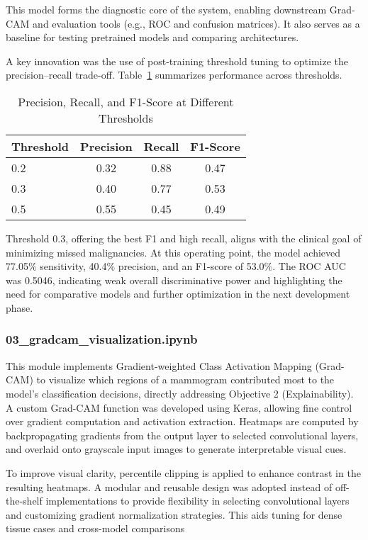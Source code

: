 \documentclass[12pt]{article}
\begin{document}
This model forms the diagnostic core of the system, enabling downstream Grad-CAM and evaluation tools (e.g., ROC and confusion matrices). It also serves as a baseline for testing pretrained models and comparing architectures.

A key innovation was the use of post-training threshold tuning to optimize the precision–recall trade-off. Table~\ref{tab:threshold_metrics} summarizes performance across thresholds.

\begin{table}[H]
\centering
\caption{Precision, Recall, and F1-Score at Different Thresholds}
\label{tab:threshold_metrics}
\begin{tabular}{lccc}
\toprule
Threshold & Precision & Recall & F1-Score \\
\midrule
0.2 & 0.32 & 0.88 & 0.47 \\
0.3 & 0.40 & 0.77 & 0.53 \\
0.5 & 0.55 & 0.45 & 0.49 \\
\bottomrule
\end{tabular}
\end{table}

Threshold 0.3, offering the best F1 and high recall, aligns with the clinical goal of minimizing missed malignancies. At this operating point, the model achieved 77.05\% sensitivity, 40.4\% precision, and an F1-score of 53.0\%. The ROC AUC was 0.5046, indicating weak overall discriminative power and highlighting the need for comparative models and further optimization in the next development phase.

\subsubsection{03\_gradcam\_visualization.ipynb}

This module implements Gradient-weighted Class Activation Mapping (Grad-CAM) to visualize which regions of a mammogram contributed most to the model’s classification decisions, directly addressing Objective 2 (Explainability). A custom Grad-CAM function was developed using Keras, allowing fine control over gradient computation and activation extraction. Heatmaps are computed by backpropagating gradients from the output layer to selected convolutional layers, and overlaid onto grayscale input images to generate interpretable visual cues.

To improve visual clarity, percentile clipping is applied to enhance contrast in the resulting heatmaps. A modular and reusable design was adopted instead of off-the-shelf implementations to provide flexibility in selecting convolutional layers and customizing gradient normalization strategies. This aids tuning for dense tissue cases and cross-model comparisons
\end{document}
